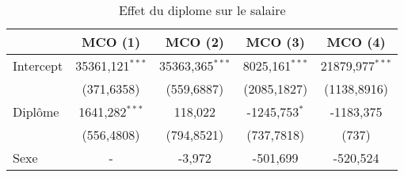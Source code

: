 \begin{table}[H]                                                                                                                                                                                                                                      
\begin{center}                                                                                                                                                                                                                                        
\caption{Effet du diplome sur le salaire} \label{}                                                                                                                                                                                                    
\begin{tabular}{lcccc} \toprule\toprule                                                                                                                                                                                                               
&  MCO (1)  &  MCO (2)  &  MCO (3)  &  MCO (4)  \\ \midrule                                                                                                                                                                                           
Intercept  & 35361,121$^{***}$  & 35363,365$^{***}$  & 8025,161$^{***}$  & 21879,977$^{***}$  \\                                                                                                                                                      
   & (371,6358)  & (559,6887)  & (2085,1827)  & (1138,8916)  \\                                                                                                                                                                                       
Diplôme  & 1641,282$^{***}$  & 118,022  & -1245,753$^{*}$  & -1183,375  \\                                                                                                                                                                            
   & (556,4808)  & (794,8521)  & (737,7818)  & (737)  \\                                                                                                                                                                                              
Sexe  & -  & -3,972  & -501,699  & -520,524  \\                                                                                                                                                                                                       

\end{tabular}
\end{center}
\end{table}

